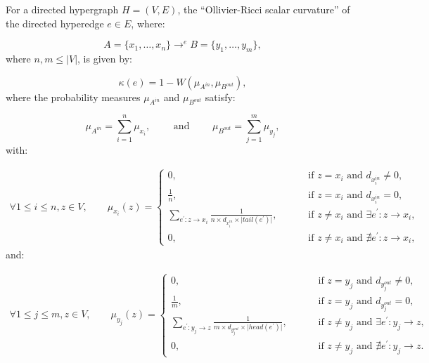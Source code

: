 \documentclass{article}
\begin{document}
\begin{definition}
For a directed hypergraph ${H = \left( V, E \right)}$, the ``Ollivier-Ricci scalar curvature'' of the directed hyperedge ${e \in E}$, where:

\begin{equation}
A = \lbrace x_1, \dots, x_n \rbrace \to^{e} B = \lbrace y_1, \dots, y_m \rbrace,
\end{equation}
where ${n, m \leq \lvert V \rvert}$, is given by:

\begin{equation}
\kappa \left( e \right) = 1 - W \left( \mu_{A^{in}}, \mu_{B^{out}} \right),
\end{equation}
where the probability measures ${\mu_{A^{in}}}$ and ${\mu_{B^{out}}}$ satisfy:

\begin{equation}
\mu_{A^{in}} = \sum_{i = 1}^{n} \mu_{x_i}, \qquad \text{ and } \qquad \mu_{B^{out}} = \sum_{j = 1}^{m} \mu_{y_j},
\end{equation}
with:

\begin{align}
\forall 1 \leq i \leq n, z \in V, \qquad \mu_{x_i} \left( z \right) = \begin{cases}
0, \qquad & \text{ if } z = x_i \text{ and } d_{x_{i}^{in}} \neq 0,\\
\frac{1}{n}, \qquad & \text{ if } z = x_i \text{ and } d_{x_{i}^{in}} = 0,\\
\sum\limits_{e^{\prime} : z \to x_i} \frac{1}{n \times d_{x_{i}^{in}} \times \lvert tail \left( e^{\prime} \right) \rvert}, \qquad & \text{ if } z \neq x_i \text{ and } \exists e^{\prime} : z \to x_i,\\
0, \qquad & \text{ if } z \neq x_i \text{ and } \nexists e^{\prime} : z \to x_i,
\end{cases}
\end{align}
and:

\begin{align}
\forall 1 \leq j \leq m, z \in V, \qquad \mu_{y_j} \left( z \right) = \begin{cases}
0, \qquad & \text{ if } z = y_j \text{ and } d_{y_{j}^{out}} \neq 0,\\
\frac{1}{m}, \qquad & \text{ if } z = y_j \text{ and } d_{y_{j}^{out}} = 0,\\
\sum\limits_{e^{\prime} : y_j \to z} \frac{1}{m \times d_{y_{j}^{out}} \times \lvert head \left( e^{\prime} \right) \rvert}, \qquad & \text{ if } z \neq y_j \text{ and } \exists e^{\prime} : y_j \to z,\\
0, \qquad & \text{ if } z \neq y_j \text{ and } \nexists e^{\prime} : y_j \to z.
\end{cases}
\end{align}
\end{definition}
\end{document}
